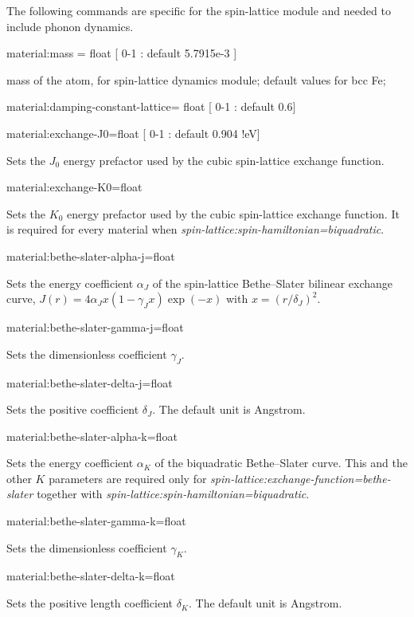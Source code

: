 The following commands are specific for the spin-lattice module and needed to include phonon dynamics.

{\zicf material:mass = float [ 0-1 : default 5.7915e-3 ]} mass of the atom, for spin-lattice dynamics module; default values for bcc Fe;

{\zicf material:damping-constant-lattice= float [ 0-1 : default 0.6]}

{\zicf material:exchange-J0=float [ 0-1 : default 0.904 !eV]}
Sets the $J_0$ energy prefactor used by the cubic spin-lattice exchange function.

{\zicf material:exchange-K0=float}
Sets the $K_0$ energy prefactor used by the cubic spin-lattice exchange function. It is required for every material when \textit{spin-lattice:spin-hamiltonian=biquadratic}.

{\zicf material:bethe-slater-alpha-j=float}
Sets the energy coefficient $\alpha_J$ of the spin-lattice Bethe--Slater bilinear exchange curve, $J(r)=4\alpha_J x(1-\gamma_J x)\exp(-x)$ with $x=(r/\delta_J)^2$.

{\zicf material:bethe-slater-gamma-j=float}
Sets the dimensionless coefficient $\gamma_J$.

{\zicf material:bethe-slater-delta-j=float}
Sets the positive coefficient $\delta_J$. The default unit is Angstrom.

{\zicf material:bethe-slater-alpha-k=float}
Sets the energy coefficient $\alpha_K$ of the biquadratic Bethe--Slater curve. This and the other $K$ parameters are required only for \textit{spin-lattice:exchange-function=bethe-slater} together with \textit{spin-lattice:spin-hamiltonian=biquadratic}.

{\zicf material:bethe-slater-gamma-k=float}
Sets the dimensionless coefficient $\gamma_K$.

{\zicf material:bethe-slater-delta-k=float}
Sets the positive length coefficient $\delta_K$. The default unit is Angstrom.

